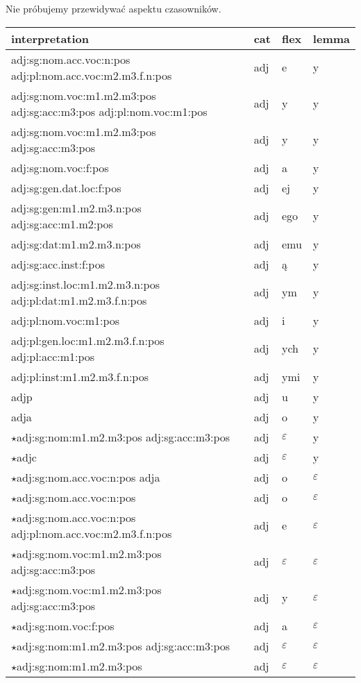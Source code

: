 \documentclass{article}
\begin{document}
Nie próbujemy przewidywać aspektu czasowników.

\begin{longtable}{p{7cm}|l|l|l}
interpretation & cat & flex & lemma\\
\hline
adj:sg:nom.acc.voc:n:pos adj:pl:nom.acc.voc:m2.m3.f.n:pos & adj & e & y\\
adj:sg:nom.voc:m1.m2.m3:pos adj:sg:acc:m3:pos adj:pl:nom.voc:m1:pos & adj & y & y\\
adj:sg:nom.voc:m1.m2.m3:pos adj:sg:acc:m3:pos & adj & y & y\\
adj:sg:nom.voc:f:pos & adj & a & y\\
adj:sg:gen.dat.loc:f:pos & adj & ej & y\\
adj:sg:gen:m1.m2.m3.n:pos adj:sg:acc:m1.m2:pos & adj & ego & y\\
adj:sg:dat:m1.m2.m3.n:pos & adj & emu & y\\
adj:sg:acc.inst:f:pos & adj & ą & y\\
adj:sg:inst.loc:m1.m2.m3.n:pos adj:pl:dat:m1.m2.m3.f.n:pos & adj & ym & y\\
adj:pl:nom.voc:m1:pos & adj & i & y\\
adj:pl:gen.loc:m1.m2.m3.f.n:pos adj:pl:acc:m1:pos & adj & ych & y\\
adj:pl:inst:m1.m2.m3.f.n:pos & adj & ymi & y\\
adjp & adj & u & y\\
adja & adj & o & y\\
$\star$adj:sg:nom:m1.m2.m3:pos adj:sg:acc:m3:pos & adj & $\varepsilon$ & y\\
$\star$adjc & adj & $\varepsilon$ & y\\
$\star$adj:sg:nom.acc.voc:n:pos adja & adj & o & $\varepsilon$\\
$\star$adj:sg:nom.acc.voc:n:pos & adj & o & $\varepsilon$\\
$\star$adj:sg:nom.acc.voc:n:pos adj:pl:nom.acc.voc:m2.m3.f.n:pos & adj & e & $\varepsilon$\\
$\star$adj:sg:nom.voc:m1.m2.m3:pos adj:sg:acc:m3:pos & adj & $\varepsilon$ & $\varepsilon$\\
$\star$adj:sg:nom.voc:m1.m2.m3:pos adj:sg:acc:m3:pos & adj & y & $\varepsilon$\\
$\star$adj:sg:nom.voc:f:pos & adj & a & $\varepsilon$\\
$\star$adj:sg:nom:m1.m2.m3:pos adj:sg:acc:m3:pos & adj & $\varepsilon$ & $\varepsilon$\\
$\star$adj:sg:nom:m1.m2.m3:pos & adj & $\varepsilon$ & $\varepsilon$\\

\end{longtable}
\end{document}
